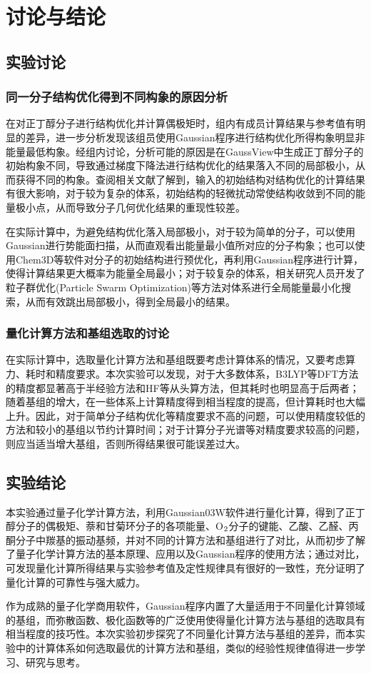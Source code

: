 \documentclass[12pt]{article}
\begin{document}
 	
\vbox{}  	
 	 \section{讨论与结论}
		\subsection{实验讨论}
 			\subsubsection{同一分子结构优化得到不同构象的原因分析}
 	 在对正丁醇分子进行结构优化并计算偶极矩时，组内有成员计算结果与参考值有明显的差异，进一步分析发现该组员使用Gaussian程序进行结构优化所得构象明显非能量最低构象。经组内讨论，分析可能的原因是在GaussView中生成正丁醇分子的初始构象不同，导致通过梯度下降法进行结构优化的结果落入不同的局部极小，从而获得不同的构象。查阅相关文献了解到，输入的初始结构对结构优化的计算结果有很大影响，对于较为复杂的体系，初始结构的轻微扰动常使结构收敛到不同的能量极小点，从而导致分子几何优化结果的重现性较差。\citealp{Williams_2007}\par
 	 在实际计算中，为避免结构优化落入局部极小，对于较为简单的分子，可以使用Gaussian进行势能面扫描，从而直观看出能量最小值所对应的分子构象；也可以使用Chem3D等软件对分子的初始结构进行预优化，再利用Gaussian程序进行计算，使得计算结果更大概率为能量全局最小；对于较复杂的体系，相关研究人员开发了粒子群优化(Particle Swarm Optimization)等方法\citealp{Call_2007}对体系进行全局能量最小化搜索，从而有效跳出局部极小，得到全局最小的结果。
 	 \subsubsection{量化计算方法和基组选取的讨论}
 	 在实际计算中，选取量化计算方法和基组既要考虑计算体系的情况，又要考虑算力、耗时和精度要求。本次实验可以发现，对于大多数体系，B3LYP等DFT方法的精度都显著高于半经验方法和HF等从头算方法，但其耗时也明显高于后两者；随着基组的增大，在一些体系上计算精度得到相当程度的提高，但计算耗时也大幅上升。因此，对于简单分子结构优化等精度要求不高的问题，可以使用精度较低的方法和较小的基组以节约计算时间；对于计算分子光谱等对精度要求较高的问题，则应当适当增大基组，否则所得结果很可能误差过大。
 	 \subsection{实验结论}
 	 本实验通过量子化学计算方法，利用Gaussian03W软件进行量化计算，得到了正丁醇分子的偶极矩、萘和甘菊环分子的各项能量、O$_{\rm 2}$分子的键能、乙酸、乙醛、丙酮分子中羰基的振动基频，并对不同的计算方法和基组进行了对比，从而初步了解了量子化学计算方法的基本原理、应用以及Gaussian程序的使用方法；通过对比，可发现量化计算所得结果与实验参考值及定性规律具有很好的一致性，充分证明了量化计算的可靠性与强大威力。\par
 	 作为成熟的量子化学商用软件，Gaussian程序内置了大量适用于不同量化计算领域的基组，而弥散函数、极化函数等的广泛使用使得量化计算方法与基组的选取具有相当程度的技巧性。本次实验初步探究了不同量化计算方法与基组的差异，而本实验中的计算体系如何选取最优的计算方法和基组，类似的经验性规律值得进一步学习、研究与思考。
 
 

   

\vbox{}  



\end{document}
